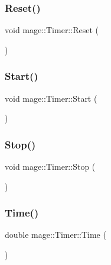 \hypertarget{classmage_1_1_timer_a0675ff7bc0a8e7343b5a35f865cc9c1a}{}\label{classmage_1_1_timer_a0675ff7bc0a8e7343b5a35f865cc9c1a} 
\subsubsection{\texorpdfstring{Reset()}{Reset()}}
{\footnotesize\ttfamily void mage\+::\+Timer\+::\+Reset (\begin{DoxyParamCaption}{ }\end{DoxyParamCaption})}

\hypertarget{classmage_1_1_timer_a5855c9df8ad1a2b6774942e566833647}{}\label{classmage_1_1_timer_a5855c9df8ad1a2b6774942e566833647} 
\subsubsection{\texorpdfstring{Start()}{Start()}}
{\footnotesize\ttfamily void mage\+::\+Timer\+::\+Start (\begin{DoxyParamCaption}{ }\end{DoxyParamCaption})}

\hypertarget{classmage_1_1_timer_abf234f1e2ee9e760f316bd49500d5a3a}{}\label{classmage_1_1_timer_abf234f1e2ee9e760f316bd49500d5a3a} 
\subsubsection{\texorpdfstring{Stop()}{Stop()}}
{\footnotesize\ttfamily void mage\+::\+Timer\+::\+Stop (\begin{DoxyParamCaption}{ }\end{DoxyParamCaption})}

\hypertarget{classmage_1_1_timer_a5e4655ac296cc8971b54e5a76082f00f}{}\label{classmage_1_1_timer_a5e4655ac296cc8971b54e5a76082f00f} 
\subsubsection{\texorpdfstring{Time()}{Time()}}
{\footnotesize\ttfamily double mage\+::\+Timer\+::\+Time (\begin{DoxyParamCaption}{ }\end{DoxyParamCaption})}



